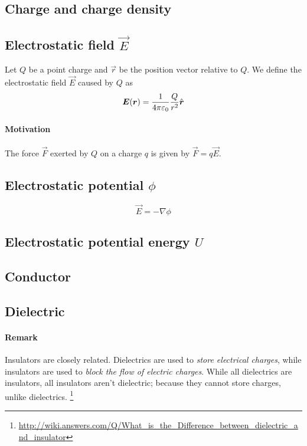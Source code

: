 \subsection{Charge and charge density}

\subsection{Electrostatic field $\vec{E}$}
\label{def:electric field}

Let $Q$ be a point charge and $\vec{r}$ be the position vector
relative to $Q$. We define the electrostatic field $\vec{E}$ caused by
$Q$ as
\begin{equation*}
  \boldsymbol{E}(\boldsymbol{r}) = \frac{1}{4\pi\varepsilon_0}\frac{Q}{r^2}\hat{\boldsymbol{r}}
\end{equation*}

\paragraph{Motivation} The force $\vec{F}$ exerted by $Q$ on a charge $q$ is
given by $\vec{F} = q\vec{E}$.

\subsection{Electrostatic potential $\phi$}
\label{def:potential}
\begin{equation*}
  \vec{E} = - \nabla\phi
\end{equation*}

\subsection{Electrostatic potential energy $U$}

\subsection{Conductor}
\label{def:conductor}

\subsection{Dielectric}
\label{def:dielectric}

\paragraph{Remark} Insulators are closely related. Dielectrics are
used to \emph{store electrical charges}, while insulators are used to
\emph{block the flow of electric charges}. While all dielectrics are
insulators, all insulators aren't dielectric; because they cannot
store charges, unlike dielectrics.
\footnote{\url{http://wiki.answers.com/Q/What_is_the_Difference_between_dielectric_and_insulator}}




